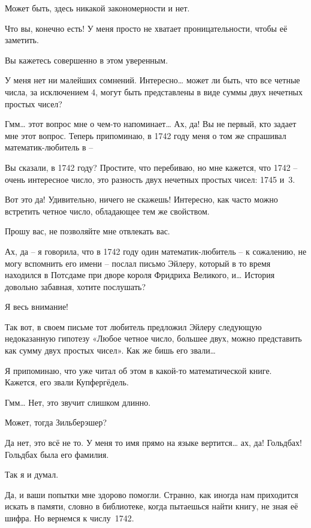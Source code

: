 \documentclass[../main.tex]{subfiles}
\begin{document}
\begin{dialogue}
 Может быть, здесь никакой закономерности и нет.

 Что вы, конечно есть! У меня просто не хватает проницательности, чтобы её заметить.

 Вы кажетесь совершенно в этом уверенным.

 У меня нет ни малейших сомнений. Интересно\ldots{} может ли быть, что все четные числа, за исключением 4, могут быть представлены в виде суммы двух нечетных простых чисел?

 Гмм\ldots{} этот вопрос мне о чем-то напоминает\ldots{} Ах, да! Вы не первый, кто задает мне этот вопрос. Теперь припоминаю, в 1742 году меня о том же спрашивал математик-любитель в \---

 Вы сказали, в 1742 году? Простите, что перебиваю, но мне кажется, что 1742 \--- очень интересное число, это разность двух нечетных простых чисел: 1745 и~3.

 Вот это да! Удивительно, ничего не скажешь! Интересно, как часто можно встретить четное число, обладающее тем же свойством.

 Прошу вас, не позволяйте мне отвлекать вас.

 Ах, да \--- я говорила, что в 1742 году один математик-любитель \--- к сожалению, не могу вспомнить его имени \--- послал письмо Эйлеру, который в то время находился в Потсдаме при дворе короля Фридриха Великого, и\ldots{} История довольно забавная, хотите послушать?

 Я весь внимание!

 Так вот, в своем письме тот любитель предложил Эйлеру следующую недоказанную гипотезу «Любое четное число, большее двух, можно представить как сумму двух простых чисел». Как же бишь его звали\ldots{}

 Я припоминаю, что уже читал об этом в какой-то математической книге. Кажется, его звали Купфергёдель.

 Гмм\ldots{} Нет, это звучит слишком длинно.

 Может, тогда Зильберэшер?

 Да нет, это всё не то. У меня то имя прямо на языке вертится\ldots{} ах, да! Гольдбах! Гольдбах была его фамилия.

 Так я и думал.

 Да, и ваши попытки мне здорово помогли. Странно, как иногда нам приходится искать в памяти, словно в библиотеке, когда пытаешься найти книгу, не зная её шифра. Но вернемся к числу~1742.


\end{dialogue}
\end{document}
